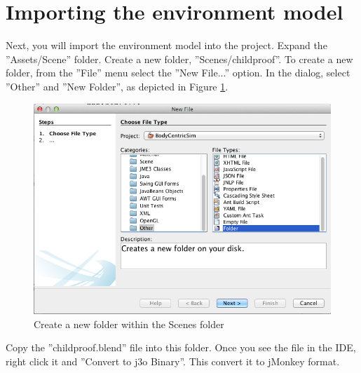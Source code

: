 \section{Importing the environment model} %
\label{sec:sd_import_env_model}
Next, you will import the environment model into the project. Expand the ''Assets/Scene'' folder. Create a new folder, ''Scenes/childproof''. To create a new folder, from the ''File'' menu select the ''New File...'' option. In the dialog, select ''Other'' and ''New Folder'', as depicted in Figure \ref{fig:sd_create_folder}.
\begin{figure}[H]
	\centering
	\includegraphics[width=\linewidth]{gfx/Chapter_SD_UserGuide/create_new_folder}
	\caption{Create a new folder within the Scenes folder}
	\label{fig:sd_create_folder}
\end{figure}

Copy the ''childproof.blend'' file into this folder. Once you see the file in the IDE, right click it and ''Convert to j3o Binary''. This convert it to jMonkey format.
